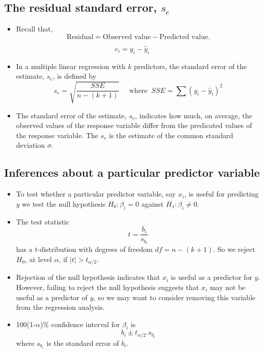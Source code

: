 \documentclass[
]{article}
\providecommand{\tightlist}{%
  \setlength{\itemsep}{0pt}\setlength{\parskip}{0pt}}
\begin{document}
\hypertarget{the-residual-standard-error-s_e}{%
\subsection{\texorpdfstring{The residual standard error,
\(s_e\)}{The residual standard error, s\_e}}\label{the-residual-standard-error-s_e}}

\begin{itemize}
\tightlist
\item
  Recall that,
  \[\text{Residual} = \text{Observed value} - \text{Predicted value.}\]
\end{itemize}

\[e_i=y_i-\hat{y}_i\]

\begin{itemize}
\item
  In a multiple linear regression with \(k\) predictors, the standard
  error of the estimate, \(s_e\), is defined by
  \[s_e=\sqrt{\frac{SSE}{n-(k+1)}}\;\;\;\;\; \text{where}\;\;SSE=\sum (y_i-\hat{y}_i)^2\]
\item
  The standard error of the estimate, \(s_e\), indicates how much, on
  average, the observed values of the response variable differ from the
  predicated values of the response variable. The \(s_e\) is the
  estimate of the common standard deviation \(\sigma\).
\end{itemize}

\hypertarget{inferences-about-a-particular-predictor-variable}{%
\subsection{Inferences about a particular predictor
variable}\label{inferences-about-a-particular-predictor-variable}}

\begin{itemize}
\item
  To test whether a particular predictor variable, say \(x_i\), is
  useful for predicting \(y\) we test the null hypothesis
  \(H_0:\beta_i=0\) against \(H_1:\beta_i\neq 0\).
\item
  The test statistic \[t=\frac{b_i}{s_{b_i}}\] has a \(t\)-distribution
  with degrees of freedom \(df=n-(k+1)\). So we reject \(H_0\), at level
  \(\alpha\), if \(|t|>t_{\alpha/2}.\)
\item
  Rejection of the null hypothesis indicates that \(x_i\) is useful as a
  predictor for \(y\). However, failing to reject the null hypothesis
  suggests that \(x_i\) may not be useful as a predictor of \(y\), so we
  may want to consider removing this variable from the regression
  analysis.
\item
  100(1-\(\alpha\))\% confidence interval for \(\beta_i\) is
  \[b_i \pm t_{\alpha/2} . s_{b_i}\] where \(s_{b_i}\) is the standard
  error of \(b_i\).
\end{itemize}
\end{document}
